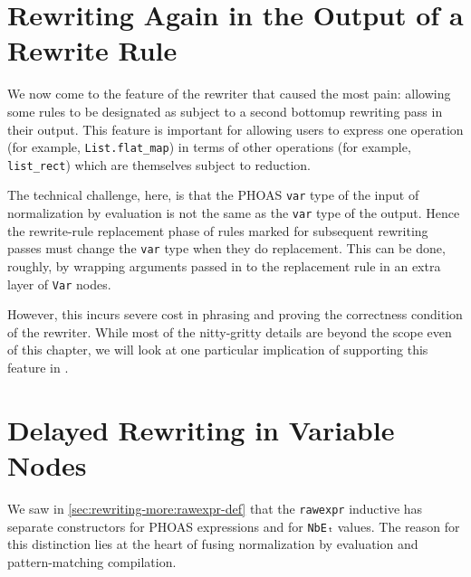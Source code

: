 
\section{Rewriting Again in the Output of a Rewrite Rule}\label{sec:rewriting-more:do-again}
We now come to the feature of the rewriter that caused the most pain: allowing some rules to be designated as subject to a second bottomup rewriting pass in their output.
This feature is important for allowing users to express one operation (for example, \texttt{List.flat_map}) in terms of other operations (for example, \texttt{list_rect}) which are themselves subject to reduction.

The technical challenge, here, is that the PHOAS \texttt{var} type of the input of normalization by evaluation is not the same as the \texttt{var} type of the output.
Hence the rewrite-rule replacement phase of rules marked for subsequent rewriting passes must change the \texttt{var} type when they do replacement.
This can be done, roughly, by wrapping arguments passed in to the replacement rule in an extra layer of \texttt{Var} nodes.

However, this incurs severe cost in phrasing and proving the correctness condition of the rewriter.
While most of the nitty-gritty details are beyond the scope even of this chapter, we will look at one particular implication of supporting this feature in .

\section{Delayed Rewriting in Variable Nodes}\label{sec:rewriting-more:delayed-rewriting}
We saw in \autoref{sec:rewriting-more:rawexpr-def} that the \texttt{rawexpr} inductive has separate constructors for PHOAS expressions and for \texttt{NbEₜ} values.
The reason for this distinction lies at the heart of fusing normalization by evaluation and pattern-matching compilation.

